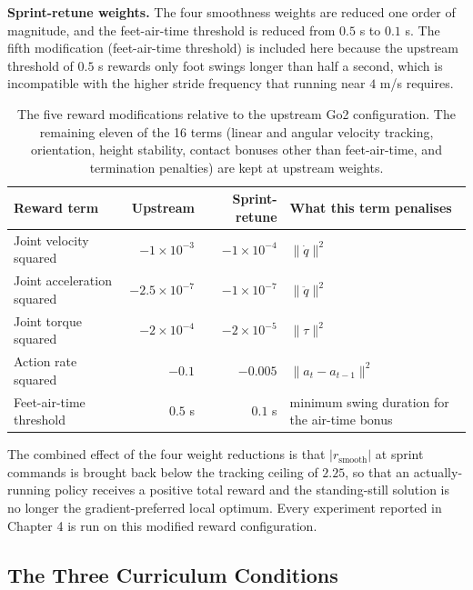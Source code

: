 \textbf{Sprint-retune weights.} The four smoothness weights are reduced one order of magnitude, and the feet-air-time threshold is reduced from $0.5$ s to $0.1$ s. The fifth modification (feet-air-time threshold) is included here because the upstream threshold of $0.5$ s rewards only foot swings longer than half a second, which is incompatible with the higher stride frequency that running near $4$ m/s requires.

\begin{table}[ht]
\centering
\begin{tabularx}{\textwidth}{@{}X r r X@{}}
\toprule
\textbf{Reward term} & \textbf{Upstream} & \textbf{Sprint-retune} & \textbf{What this term penalises} \\
\midrule
Joint velocity squared      & $-1 \times 10^{-3}$ & $-1 \times 10^{-4}$ & $\|\dot{q}\|^2$ \\
\addlinespace
Joint acceleration squared  & $-2.5 \times 10^{-7}$ & $-1 \times 10^{-7}$ & $\|\ddot{q}\|^2$ \\
\addlinespace
Joint torque squared        & $-2 \times 10^{-4}$ & $-2 \times 10^{-5}$ & $\|\tau\|^2$ \\
\addlinespace
Action rate squared         & $-0.1$ & $-0.005$ & $\|a_t - a_{t-1}\|^2$ \\
\addlinespace
Feet-air-time threshold     & $0.5$ s & $0.1$ s & minimum swing duration for the air-time bonus \\
\bottomrule
\end{tabularx}
\caption{The five reward modifications relative to the upstream Go2 configuration. The remaining eleven of the 16 terms (linear and angular velocity tracking, orientation, height stability, contact bonuses other than feet-air-time, and termination penalties) are kept at upstream weights.}
\label{tab:sprint_retune}
\end{table}

The combined effect of the four weight reductions is that $|r_{\mathrm{smooth}}|$ at sprint commands is brought back below the tracking ceiling of $2.25$, so that an actually-running policy receives a positive total reward and the standing-still solution is no longer the gradient-preferred local optimum. Every experiment reported in Chapter 4 is run on this modified reward configuration.

\subsection{The Three Curriculum Conditions}

